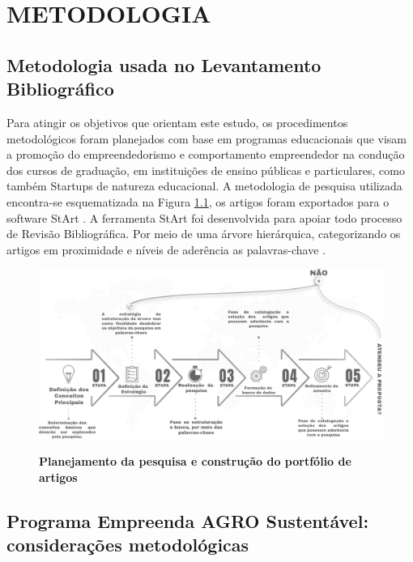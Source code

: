 \chapter{METODOLOGIA}

\section{Metodologia usada no Levantamento Bibliográfico}


Para atingir os objetivos que orientam este estudo, os procedimentos metodológicos foram planejados com base em programas educacionais que visam a promoção do empreendedorismo e comportamento empreendedor na condução dos cursos de graduação, em instituições de ensino públicas e particulares, como também Startups de natureza educacional. A metodologia de pesquisa utilizada encontra-se esquematizada na Figura \ref{figura_29}, os artigos foram exportados para o software StArt \cite{lapes_start_2016}. A ferramenta StArt foi desenvolvida para apoiar todo processo de Revisão Bibliográfica. Por meio de uma árvore hierárquica, categorizando os artigos em proximidade e níveis de aderência as palavras-chave \cite{hernandes_avaliacao_2010}. 

\begin{figure}[!htb]
\centering
\caption{\textbf{Planejamento da pesquisa e construção do portfólio de artigos}}
\includegraphics[scale=0.5]{Imagens/fases_pesquisa_bibliografica.png}
\label{figura_29}
\end{figure}






\section{Programa Empreenda AGRO Sustentável: considerações metodológicas}


